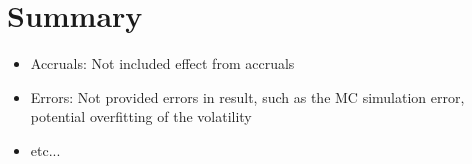 \documentclass{article}
\begin{document}
\section{Summary}

\begin{itemize}
\item Accruals: Not included effect from accruals
\item Errors: Not provided errors in result, such as the MC simulation error, potential overfitting of the volatility 
\item etc...
\end{itemize}

    
    
    
    
\end{document}
